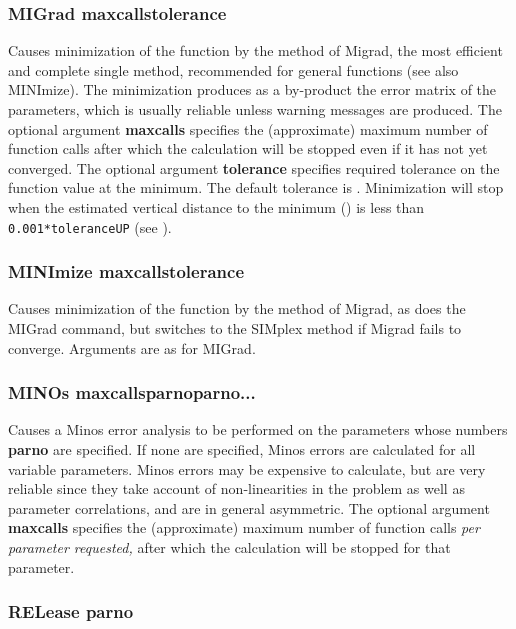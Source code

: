 \subsubsection*{MIGrad  \lsb maxcalls\rsb   \lsb tolerance\rsb }
\par
Causes minimization of the function by the method of Migrad, the most
efficient and complete single method, recommended for general functions
(see also MINImize).
The minimization produces as a by-product the error matrix
of the parameters, which is usually reliable unless warning messages
are produced.
The optional argument {\bf \lsb maxcalls\rsb } specifies the (approximate) maximum
number of function calls after which the calculation will be stopped
even if it has not yet converged.
The optional argument {\bf \lsb tolerance\rsb } specifies required tolerance on the
function value at the minimum.  
The default tolerance is .
Minimization will stop when the estimated vertical distance to
the minimum () is less than {\tt 0.001*\lsb tolerance\rsb *UP} 
(see ).

\subsubsection*{MINImize  \lsb maxcalls\rsb  \lsb tolerance\rsb }

Causes minimization of the function by the method of Migrad,
as does the MIGrad command, but switches to the SIMplex method
if Migrad fails to converge. Arguments are as for MIGrad.

\subsubsection*{MINOs   \lsb maxcalls\rsb   \lsb parno\rsb  \lsb parno\rsb  ...}

Causes a Minos error analysis to be performed on the parameters whose
numbers {\bf \lsb parno\rsb } are specified.
If none are specified, Minos errors
are calculated for all variable parameters.
Minos errors may be expensive to calculate, but are very reliable since
they take account of non-linearities in the problem as well as
parameter correlations, and are in general asymmetric.
The optional argument {\bf \lsb maxcalls\rsb } specifies the 
(approximate) maximum
number of function calls \emph{per parameter requested,}
after which the calculation will be stopped for that parameter.

\subsubsection*{RELease  parno}

